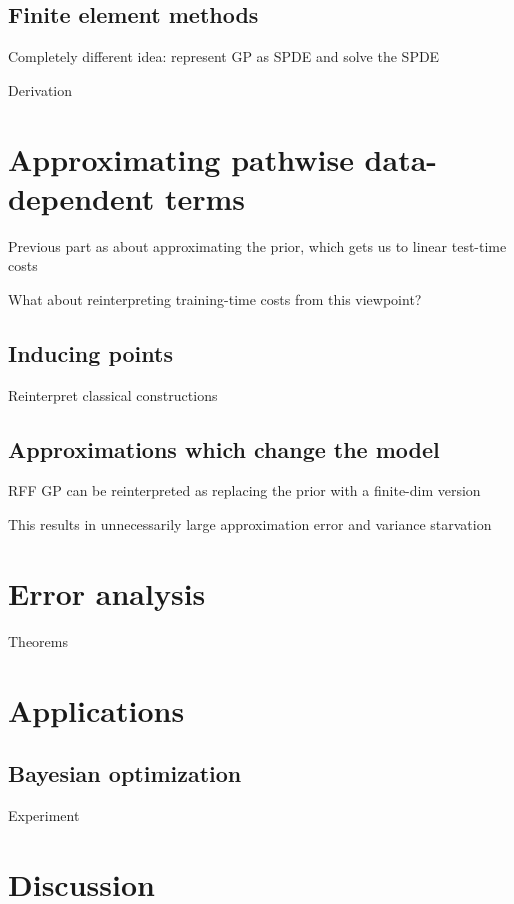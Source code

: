 \documentclass[11pt]{book}
\begin{document}
\subsection{Finite element methods}

Completely different idea: represent GP as SPDE and solve the SPDE

Derivation

\section{Approximating pathwise data-dependent terms}

Previous part as about approximating the prior, which gets us to linear test-time costs

What about reinterpreting training-time costs from this viewpoint?

\subsection{Inducing points}

Reinterpret classical constructions

\subsection{Approximations which change the model}

RFF GP can be reinterpreted as replacing the prior with a finite-dim version

This results in unnecessarily large approximation error and variance starvation

\section{Error analysis}

Theorems

\section{Applications}

\subsection{Bayesian optimization}

Experiment

\section{Discussion}
\end{document}
